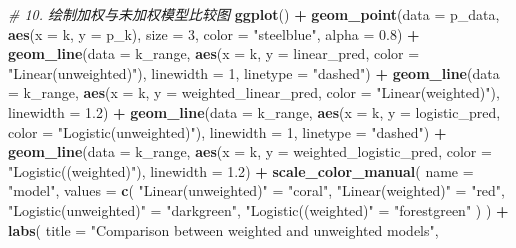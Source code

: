 \documentclass[
]{article}
\newenvironment{Shaded}{\begin{snugshade}}{\end{snugshade}}
\newcommand{\AttributeTok}[1]{\textcolor[rgb]{0.13,0.29,0.53}{#1}}
\newcommand{\CommentTok}[1]{\textcolor[rgb]{0.56,0.35,0.01}{\textit{#1}}}
\newcommand{\DecValTok}[1]{\textcolor[rgb]{0.00,0.00,0.81}{#1}}
\newcommand{\FloatTok}[1]{\textcolor[rgb]{0.00,0.00,0.81}{#1}}
\newcommand{\FunctionTok}[1]{\textcolor[rgb]{0.13,0.29,0.53}{\textbf{#1}}}
\newcommand{\NormalTok}[1]{#1}
\newcommand{\OtherTok}[1]{\textcolor[rgb]{0.56,0.35,0.01}{#1}}
\newcommand{\SpecialCharTok}[1]{\textcolor[rgb]{0.81,0.36,0.00}{\textbf{#1}}}
\newcommand{\StringTok}[1]{\textcolor[rgb]{0.31,0.60,0.02}{#1}}
\begin{document}
\begin{Shaded}
\begin{Highlighting}[]
\CommentTok{\# 10. 绘制加权与未加权模型比较图}
\FunctionTok{ggplot}\NormalTok{() }\SpecialCharTok{+}
  \FunctionTok{geom\_point}\NormalTok{(}\AttributeTok{data =}\NormalTok{ p\_data, }\FunctionTok{aes}\NormalTok{(}\AttributeTok{x =}\NormalTok{ k, }\AttributeTok{y =}\NormalTok{ p\_k), }\AttributeTok{size =} \DecValTok{3}\NormalTok{, }\AttributeTok{color =} \StringTok{"steelblue"}\NormalTok{, }\AttributeTok{alpha =} \FloatTok{0.8}\NormalTok{) }\SpecialCharTok{+}
  \FunctionTok{geom\_line}\NormalTok{(}\AttributeTok{data =}\NormalTok{ k\_range, }\FunctionTok{aes}\NormalTok{(}\AttributeTok{x =}\NormalTok{ k, }\AttributeTok{y =}\NormalTok{ linear\_pred, }\AttributeTok{color =} \StringTok{"Linear(unweighted)"}\NormalTok{), }\AttributeTok{linewidth =} \DecValTok{1}\NormalTok{, }\AttributeTok{linetype =} \StringTok{"dashed"}\NormalTok{) }\SpecialCharTok{+}
  \FunctionTok{geom\_line}\NormalTok{(}\AttributeTok{data =}\NormalTok{ k\_range, }\FunctionTok{aes}\NormalTok{(}\AttributeTok{x =}\NormalTok{ k, }\AttributeTok{y =}\NormalTok{ weighted\_linear\_pred, }\AttributeTok{color =} \StringTok{"Linear(weighted)"}\NormalTok{), }\AttributeTok{linewidth =} \FloatTok{1.2}\NormalTok{) }\SpecialCharTok{+}
  \FunctionTok{geom\_line}\NormalTok{(}\AttributeTok{data =}\NormalTok{ k\_range, }\FunctionTok{aes}\NormalTok{(}\AttributeTok{x =}\NormalTok{ k, }\AttributeTok{y =}\NormalTok{ logistic\_pred, }\AttributeTok{color =} \StringTok{"Logistic(unweighted)"}\NormalTok{), }\AttributeTok{linewidth =} \DecValTok{1}\NormalTok{, }\AttributeTok{linetype =} \StringTok{"dashed"}\NormalTok{) }\SpecialCharTok{+}
  \FunctionTok{geom\_line}\NormalTok{(}\AttributeTok{data =}\NormalTok{ k\_range, }\FunctionTok{aes}\NormalTok{(}\AttributeTok{x =}\NormalTok{ k, }\AttributeTok{y =}\NormalTok{ weighted\_logistic\_pred, }\AttributeTok{color =} \StringTok{"Logistic((weighted)"}\NormalTok{), }\AttributeTok{linewidth =} \FloatTok{1.2}\NormalTok{) }\SpecialCharTok{+}
  \FunctionTok{scale\_color\_manual}\NormalTok{(}
    \AttributeTok{name =} \StringTok{"model"}\NormalTok{,}
    \AttributeTok{values =} \FunctionTok{c}\NormalTok{(}
      \StringTok{"Linear(unweighted)"} \OtherTok{=} \StringTok{"coral"}\NormalTok{,}
      \StringTok{"Linear(weighted)"} \OtherTok{=} \StringTok{"red"}\NormalTok{,}
      \StringTok{"Logistic(unweighted)"} \OtherTok{=} \StringTok{"darkgreen"}\NormalTok{,}
      \StringTok{"Logistic((weighted)"} \OtherTok{=} \StringTok{"forestgreen"}
\NormalTok{    )}
\NormalTok{  ) }\SpecialCharTok{+}
  \FunctionTok{labs}\NormalTok{(}
    \AttributeTok{title =} \StringTok{"Comparison between weighted and unweighted models"}\NormalTok{,}

\end{Highlighting}
\end{Shaded}
\end{document}

